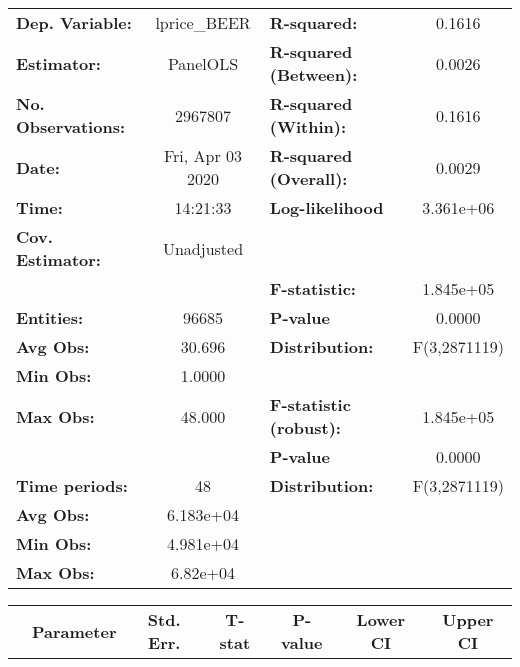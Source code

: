 \documentclass{report}
\begin{document}
\begin{center}
\begin{tabular}{lclc}
\toprule
\textbf{Dep. Variable:}    &    lprice\_BEER    & \textbf{  R-squared:         }   &      0.1616      \\
\textbf{Estimator:}        &      PanelOLS      & \textbf{  R-squared (Between):}  &      0.0026      \\
\textbf{No. Observations:} &      2967807       & \textbf{  R-squared (Within):}   &      0.1616      \\
\textbf{Date:}             &  Fri, Apr 03 2020  & \textbf{  R-squared (Overall):}  &      0.0029      \\
\textbf{Time:}             &      14:21:33      & \textbf{  Log-likelihood     }   &    3.361e+06     \\
\textbf{Cov. Estimator:}   &     Unadjusted     & \textbf{                     }   &                  \\
\textbf{}                  &                    & \textbf{  F-statistic:       }   &    1.845e+05     \\
\textbf{Entities:}         &       96685        & \textbf{  P-value            }   &      0.0000      \\
\textbf{Avg Obs:}          &       30.696       & \textbf{  Distribution:      }   &   F(3,2871119)   \\
\textbf{Min Obs:}          &       1.0000       & \textbf{                     }   &                  \\
\textbf{Max Obs:}          &       48.000       & \textbf{  F-statistic (robust):} &    1.845e+05     \\
\textbf{}                  &                    & \textbf{  P-value            }   &      0.0000      \\
\textbf{Time periods:}     &         48         & \textbf{  Distribution:      }   &   F(3,2871119)   \\
\textbf{Avg Obs:}          &     6.183e+04      & \textbf{                     }   &                  \\
\textbf{Min Obs:}          &     4.981e+04      & \textbf{                     }   &                  \\
\textbf{Max Obs:}          &      6.82e+04      & \textbf{                     }   &                  \\
\bottomrule
\end{tabular}
\begin{tabular}{lcccccc}
                           & \textbf{Parameter} & \textbf{Std. Err.} & \textbf{T-stat} & \textbf{P-value} & \textbf{Lower CI} & \textbf{Upper CI}  \\

\end{tabular}
\end{center}
\end{document}
